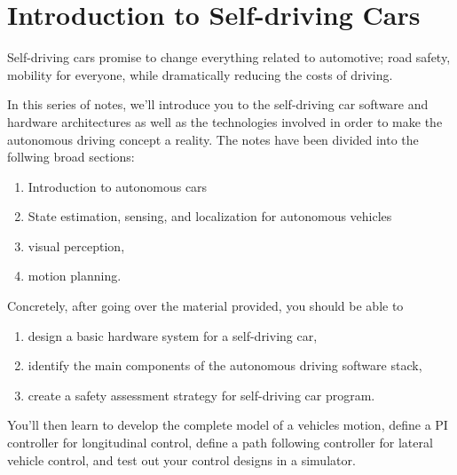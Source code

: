 \section{Introduction to Self-driving Cars}
\label{introduction_self_driving_cars}
Self-driving cars promise to change everything related to automotive; road safety, mobility for everyone,  while dramatically reducing the costs of driving. 


In this series of notes, we'll introduce you to the self-driving car software and hardware architectures as well as the technologies involved in order to make
the autonomous driving concept a reality. The notes have been divided into the follwing broad sections:

\begin{enumerate}
\item Introduction to autonomous cars
\item State estimation, sensing, and localization for autonomous vehicles
\item visual perception, 
\item motion planning. 
\end{enumerate}

Concretely, after going over the material provided, you should be able to

\begin{enumerate}
\item design a basic hardware system for a self-driving car, 
\item identify the main components of the autonomous driving software stack, 
\item create a safety assessment strategy for self-driving car program. 
\end{enumerate}

You'll then learn to develop the complete model of a vehicles motion, define a PI controller for longitudinal control, define a path following controller for lateral vehicle control, and test out your control designs in a simulator. 


